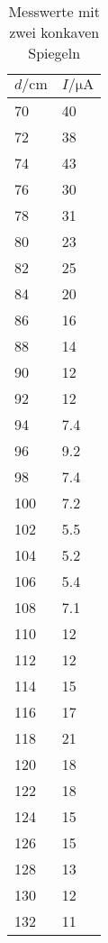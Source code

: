 \begin{table}[H]
  \centering
  \caption{Messwerte mit zwei konkaven Spiegeln}
  \label{tab:tabe1}
    \begin{tabular}{l l}
    \toprule
    $ d / \si{\centi\meter} $ & $ I / \si{\micro\ampere} $ \\
    \midrule
    70 & 40 \\
    72 & 38 \\
    74 & 43 \\
    76 & 30 \\
    78 & 31 \\
    80 & 23 \\
    82 & 25 \\
    84 & 20 \\
    86 & 16 \\
    88 & 14 \\
    90 & 12 \\
    92 & 12 \\
    94 & 7.4 \\
    96 & 9.2 \\
    98 & 7.4 \\
    100 & 7.2 \\
    102 & 5.5 \\
    104 & 5.2 \\
    106 & 5.4 \\
    108 & 7.1 \\
    110 & 12 \\
    112 & 12 \\
    114 & 15 \\
    116 & 17 \\
    118 & 21 \\
    120 & 18 \\
    122 & 18 \\
    124 & 15 \\
    126 & 15 \\
    128 & 13 \\
    130 & 12 \\
    132 & 11 \\



          \bottomrule
        \end{tabular}
    \end{table}

